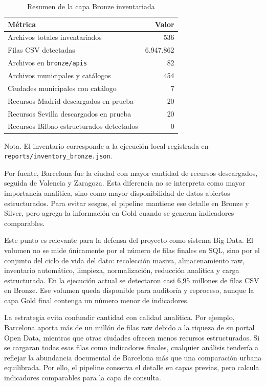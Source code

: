 \begin{table}[htbp]
\caption{Resumen de la capa Bronze inventariada}
\label{tab:bronze-inventario}
\centering
\begin{tabular}{lr}
\toprule
\textbf{Métrica} & \textbf{Valor} \\
\midrule
Archivos totales inventariados & 536 \\
Filas CSV detectadas & 6.947.862 \\
Archivos en \texttt{bronze/apis} & 82 \\
Archivos municipales y catálogos & 454 \\
Ciudades municipales con catálogo & 7 \\
Recursos Madrid descargados en prueba & 20 \\
Recursos Sevilla descargados en prueba & 20 \\
Recursos Bilbao estructurados detectados & 0 \\
\bottomrule
\end{tabular}
\vspace{0.4em}
\begin{flushleft}
\small Nota. El inventario corresponde a la ejecución local registrada en \texttt{reports/inventory\_bronze.json}.
\end{flushleft}
\end{table}

Por fuente, Barcelona fue la ciudad con mayor cantidad de recursos descargados, seguida de Valencia y Zaragoza. Esta diferencia no se interpreta como mayor importancia analítica, sino como mayor disponibilidad de datos abiertos estructurados. Para evitar sesgos, el pipeline mantiene ese detalle en Bronze y Silver, pero agrega la información en Gold cuando se generan indicadores comparables.

Este punto es relevante para la defensa del proyecto como sistema Big Data. El volumen no se mide únicamente por el número de filas finales en SQL, sino por el conjunto del ciclo de vida del dato: recolección masiva, almacenamiento raw, inventario automático, limpieza, normalización, reducción analítica y carga estructurada. En la ejecución actual se detectaron casi 6,95 millones de filas CSV en Bronze. Ese volumen queda disponible para auditoría y reproceso, aunque la capa Gold final contenga un número menor de indicadores.

La estrategia evita confundir cantidad con calidad analítica. Por ejemplo, Barcelona aporta más de un millón de filas raw debido a la riqueza de su portal Open Data, mientras que otras ciudades ofrecen menos recursos estructurados. Si se cargaran todas esas filas como indicadores finales, cualquier análisis tendería a reflejar la abundancia documental de Barcelona más que una comparación urbana equilibrada. Por ello, el pipeline conserva el detalle en capas previas, pero calcula indicadores comparables para la capa de consulta.

